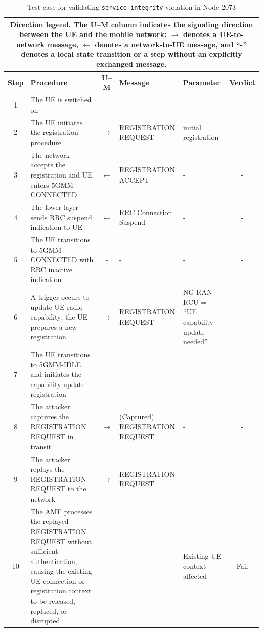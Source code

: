 \documentclass[sigconf]{acmart}
\begin{document}
{\begin{table}[!t]
\scriptsize
\centering
\caption{Test case for validating \texttt{service integrity} violation in Node 2073}
\label{tab:replay-2073}
\vspace{-0.1in}
\setlength{\tabcolsep}{3pt}
\renewcommand{\arraystretch}{1.1}
\begin{tabular}{|c|p{7cm}|c|p{3.5cm}|p{3cm}|c|}
\hline
\multicolumn{6}{|p{0.96\textwidth}|}{
\textbf{Direction legend.} The U--M column indicates the signaling direction between the UE and the mobile network: $\rightarrow$ denotes a UE-to-network message, $\leftarrow$ denotes a network-to-UE message, and ``-'' denotes a local state transition or a step without an explicitly exchanged message.
} \\
\hline
\textbf{Step} & \textbf{Procedure} & \textbf{U--M} & \textbf{Message} & \textbf{Parameter} & \textbf{Verdict} \\
\hline
1 & The UE is switched on & - & - & - & - \\
\hline
2 & The UE initiates the registration procedure & $\rightarrow$ & REGISTRATION REQUEST & initial registration & - \\
\hline
3 & The network accepts the registration and UE enters 5GMM-CONNECTED & $\leftarrow$ & REGISTRATION ACCEPT & - & - \\
\hline
4 & The lower layer sends RRC suspend indication to UE & $\leftarrow$ & RRC Connection Suspend & - & - \\
\hline
5 & The UE transitions to 5GMM-CONNECTED with RRC inactive indication & - & - & - & - \\
\hline
6 & A trigger occurs to update UE radio capability; the UE prepares a new registration & $\rightarrow$ & REGISTRATION REQUEST & NG-RAN-RCU = ``UE capability update needed'' & - \\
\hline
7 & The UE transitions to 5GMM-IDLE and initiates the capability update registration & - & - & - & - \\
\hline
8 & The attacker captures the REGISTRATION REQUEST in transit & $\rightarrow$ & (Captured) REGISTRATION REQUEST & - & - \\
\hline
9 & The attacker replays the REGISTRATION REQUEST to the network & $\rightarrow$ & REGISTRATION REQUEST & - & - \\
\hline
10 & The AMF processes the replayed REGISTRATION REQUEST without sufficient authentication, causing the existing UE connection or registration context to be released, replaced, or disrupted & - & - & Existing UE context affected & Fail \\
\hline
\end{tabular}
\end{table}


}
\end{document}

